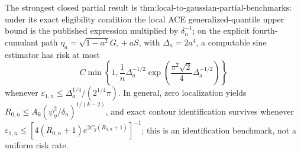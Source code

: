 The strongest closed partial result is \(\text{thm:local-to-gaussian-partial-benchmarks}\): under its exact eligibility condition the local ACE generalized-quantile upper bound is the published expression multiplied by \(\delta_n^{-1}\); on the explicit fourth-cumulant path \(\eta_a=\sqrt{1-a^2}G_{\circ}+aS\), with \(\Delta_a=2a^4\), a computable sine estimator has risk at most
\[
 C\min\left\{1,\frac1n\Delta_a^{-1/2}
 \exp\left(\frac{\pi^2\sqrt2}{4}\Delta_a^{-1/2}\right)\right\}
\]
whenever \(\varepsilon_{1,n}\le\Delta_a^{1/4}/(2^{1/4}\pi)\). In general, zero localization yields \(R_{0,n}\le A_k(\psi_{\eta}^2/\delta_n)^{1/(k-2)}\), and exact contour identification survives whenever \(\varepsilon_{1,n}\le[4(R_{0,n}+1)e^{2C_g(R_{0,n}+1)}]^{-1}\); this is an identification benchmark, not a uniform risk rate.